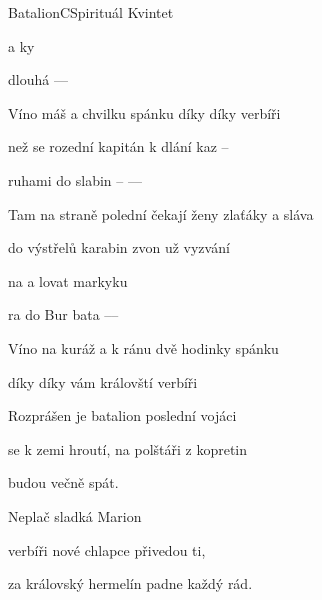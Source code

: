 \begin{song}{Batalion}{C}{Spirituál Kvintet}

\begin{SBChorus}
  a ky

dlouhá   ---- 

Víno máš a chvilku spánku díky díky verbíři
\end{SBChorus}
\begin{SBVerse}
 než se rozední kapitán k dlání kaz --

ruhami do slabin -- ----

Tam na straně polední čekají ženy zlaťáky a sláva

do výstřelů karabin zvon už vyzvání
\end{SBVerse}
\begin{SBChorus}
 na  a lovat markyku

ra do Bur bata ----

Víno na kuráž a k ránu dvě hodinky spánku

díky díky vám královští verbíři

\end{SBChorus}
\begin{SBVerse}
Rozprášen je batalion poslední vojáci

se k zemi hroutí, na polštáři z kopretin

budou večně spát.

Neplač sladká Marion

verbíři nové chlapce přivedou ti,

za královský hermelín padne každý rád.
\end{SBVerse}
\end{song}
